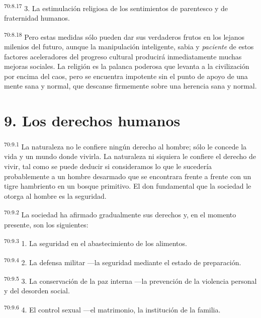 \par
\textsuperscript{70:8.17} 3. La estimulación religiosa de los sentimientos de parentesco y de fraternidad humanos.

\par
\textsuperscript{70:8.18} Pero estas medidas sólo pueden dar sus verdaderos frutos en los lejanos milenios del futuro, aunque la manipulación inteligente, sabia y \textit{paciente} de estos factores aceleradores del progreso cultural producirá inmediatamente muchas mejoras sociales. La religión es la palanca poderosa que levanta a la civilización por encima del caos, pero se encuentra impotente sin el punto de apoyo de una mente sana y normal, que descanse firmemente sobre una herencia sana y normal.

\section*{9. Los derechos humanos}
\par
\textsuperscript{70:9.1} La naturaleza no le confiere ningún derecho al hombre; sólo le concede la vida y un mundo donde vivirla. La naturaleza ni siquiera le confiere el derecho de vivir, tal como se puede deducir si consideramos lo que le sucedería probablemente a un hombre desarmado que se encontrara frente a frente con un tigre hambriento en un bosque primitivo. El don fundamental que la sociedad le otorga al hombre es la seguridad.

\par
\textsuperscript{70:9.2} La sociedad ha afirmado gradualmente sus derechos y, en el momento presente, son los siguientes:

\par
\textsuperscript{70:9.3} 1. La seguridad en el abastecimiento de los alimentos.

\par
\textsuperscript{70:9.4} 2. La defensa militar ---la seguridad mediante el estado de preparación.

\par
\textsuperscript{70:9.5} 3. La conservación de la paz interna ---la prevención de la violencia personal y del desorden social.

\par
\textsuperscript{70:9.6} 4. El control sexual ---el matrimonio, la institución de la familia.

